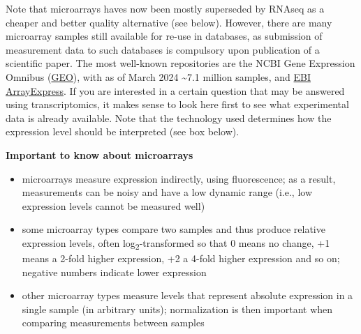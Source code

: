 Note that microarrays haves now been mostly superseded by RNAseq as a
cheaper and better quality alternative (see below).
However, there are many microarray samples still available for re-use in
databases, as submission of measurement data to such databases is compulsory
upon publication of a scientific paper.  The most well-known repositories
are the NCBI Gene Expression Omnibus
(\href{https://www.ncbi.nlm.nih.gov/geo/}{GEO}), with as of March 2024 {\textasciitilde}7.1
million samples, and \href{https://www.ebi.ac.uk/biostudies/arrayexpress}{EBI
ArrayExpress}.  If you are
interested in a certain question that may be answered using transcriptomics,
it makes sense to look here first to see what experimental data is already
available. Note that the technology used determines how the expression
level should be interpreted (see box below).

\begin{framed}
\textbf{Important to know about microarrays}\\
\begin{itemize}
\item microarrays measure expression indirectly, using fluorescence; as a
result, measurements can be noisy and have a low dynamic range (i.e., low
expression levels cannot be measured well)
\item some microarray types compare two samples and thus produce relative expression levels, often log\textsubscript{2}-transformed so that 0 means no change, +1
means a 2-fold higher expression, +2 a 4-fold higher expression and so on; negative numbers indicate lower expression
\item other microarray types measure levels that represent absolute expression in a single sample (in arbitrary
units); normalization is then important when comparing measurements between samples
\end{itemize}
\end{framed}

